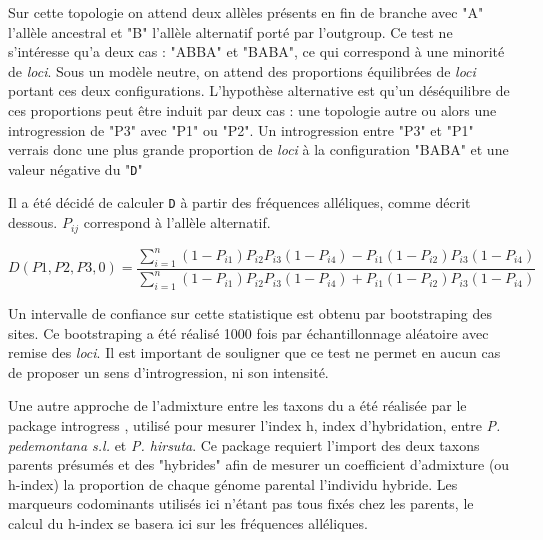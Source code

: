 Sur cette topologie on attend deux allèles présents en fin de branche avec "A" l'allèle ancestral et "B" l'allèle alternatif porté par l'outgroup.
 Ce test ne s'intéresse qu'a deux cas : "ABBA" et "BABA", ce qui correspond à une minorité de \textit{loci}. Sous un modèle neutre, on attend des proportions équilibrées de \textit{loci} portant ces deux configurations. L'hypothèse alternative est qu'un déséquilibre de ces proportions peut être induit par deux cas : une topologie autre ou alors une introgression de "P3" avec "P1" ou "P2".
 Un introgression entre "P3" et "P1" verrais donc une plus grande proportion de \textit{loci} à la configuration "BABA" et une valeur négative du "\verb|D|"



Il a été décidé de calculer \verb|D| à partir des fréquences alléliques, comme décrit dessous.
 \textit{$P_{ij}$} correspond à l'allèle alternatif.

\[D(P1,P2,P3,0)=\frac{\sum_{i=1}^{n} (1-P_{i1})P_{i2}P_{i3}(1-P_{i4})-P_{i1}(1-P_{i2})P_{i3}(1-P_{i4})}{\sum_{i=1}^{n} (1-P_{i1})P_{i2}P_{i3}(1-P_{i4})+P_{i1}(1-P_{i2})P_{i3}(1-P_{i4})}\]

Un intervalle de confiance sur cette statistique est obtenu par bootstraping des sites. Ce bootstraping a été réalisé 1000 fois par échantillonnage aléatoire avec remise des \textit{loci}.
Il est important de souligner que ce test ne permet en aucun cas de proposer un sens d'introgression, ni son intensité.

Une autre approche de l'admixture entre les taxons du  a été réalisée par le package introgress \citep{Gompert2010}, utilisé pour mesurer l'index h, index d'hybridation, entre \textit{P. pedemontana s.l.} et \textit{P. hirsuta}.
 Ce package requiert l'import des deux taxons parents présumés et des "hybrides" afin de mesurer un coefficient d'admixture (ou h-index) \DIFdelbegin {}\DIFdelend \DIFaddbegin {}\DIFaddend la proportion de chaque génome parental \DIFdelbegin {}\DIFdelend \DIFaddbegin {}\DIFaddend l'individu hybride.
 Les marqueurs codominants utilisés ici n'étant pas tous fixés chez les parents, le calcul du h-index se basera ici sur les fréquences alléliques.

